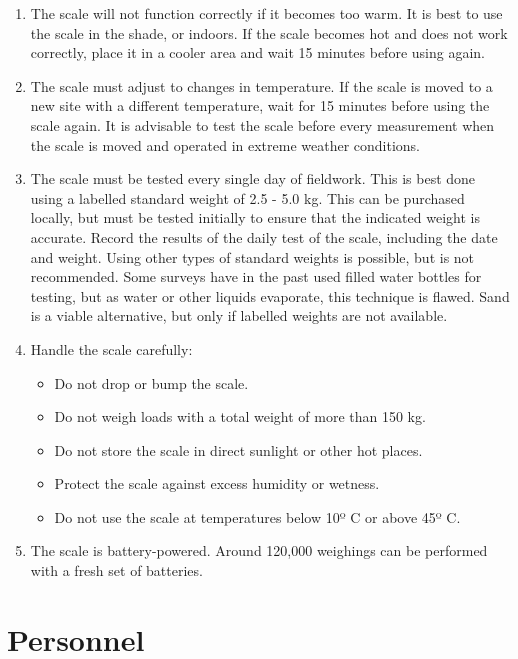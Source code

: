 \documentclass[
  12pt,
]{book}
\providecommand{\tightlist}{%
  \setlength{\itemsep}{0pt}\setlength{\parskip}{0pt}}
\begin{document}
\begin{enumerate}
\def\labelenumi{\arabic{enumi}.}
\setcounter{enumi}{1}
\item
  The scale will not function correctly if it becomes too warm. It is best to use the scale in the shade, or indoors. If the scale becomes hot and does not work correctly, place it in a cooler area and wait 15 minutes before using again.
\item
  The scale must adjust to changes in temperature. If the scale is moved to a new site with a different temperature, wait for 15 minutes before using the scale again. It is advisable to test the scale before every measurement when the scale is moved and operated in extreme weather conditions.
\item
  The scale must be tested every single day of fieldwork. This is best done using a labelled standard weight of 2.5 - 5.0 kg. This can be purchased locally, but must be tested initially to ensure that the indicated weight is accurate. Record the results of the daily test of the scale, including the date and weight. Using other types of standard weights is possible, but is not recommended. Some surveys have in the past used filled water bottles for testing, but as water or other liquids evaporate, this technique is flawed. Sand is a viable alternative, but only if labelled weights are not available.
\item
  Handle the scale carefully:

  \begin{itemize}
  \tightlist
  \item
    Do not drop or bump the scale.
  \item
    Do not weigh loads with a total weight of more than 150 kg.
  \item
    Do not store the scale in direct sunlight or other hot places.
  \item
    Protect the scale against excess humidity or wetness.
  \item
    Do not use the scale at temperatures below 10º C or above 45º C.
  \end{itemize}
\item
  The scale is battery-powered. Around 120,000 weighings can be performed with a fresh set of batteries.
\end{enumerate}

\hypertarget{personnel}{%
\section{Personnel}\label{personnel}}
\end{document}
